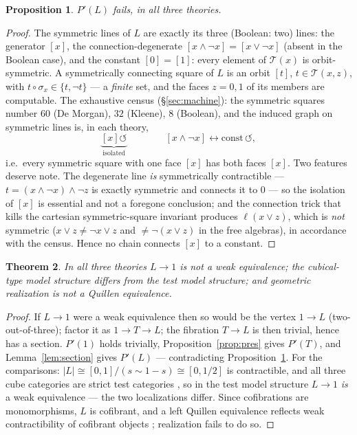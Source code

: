\documentclass[11pt]{amsart}
\newtheorem{thm}{Theorem}[section]
\newtheorem{prop}[thm]{Proposition}
\theoremstyle{definition}
\newcommand{\Ldash}{L}
\begin{document}
\begin{prop}
  \label{prop:census}
  $P'(\Ldash)$ fails, in all three theories.
\end{prop}

\begin{proof}
  The symmetric lines of $\Ldash$ are exactly its three (Boolean:
  two) lines: the generator $[x]$, the connection-degenerate
  $[x \wedge \neg x] = [x \vee \neg x]$ (absent in the Boolean
  case), and the constant $[0] = [1]$: every element of
  $\mathcal{T}(x)$ is orbit-symmetric.  A symmetrically connecting
  square of $\Ldash$ is an orbit $[t]$, $t \in \mathcal{T}(x,z)$,
  with $t \circ \sigma_x \in \{t, \neg t\}$ --- a \emph{finite} set,
  and the faces $z = 0, 1$ of its members are computable.  The
  exhaustive census (\S\ref{sec:machine}): the symmetric squares
  number $60$ (De Morgan), $32$ (Kleene), $8$ (Boolean), and the
  induced graph on symmetric lines is, in each theory,
  \[
    \underbrace{[x] \circlearrowleft}_{\text{isolated}}
    \qquad\qquad
    [x \wedge \neg x] \longleftrightarrow \text{const}
    \,\circlearrowleft ,
  \]
  i.e.\ every symmetric square with one face $[x]$ has both faces
  $[x]$.  Two features deserve note.  The degenerate line
  \emph{is} symmetrically contractible ---
  $t = (x \wedge \neg x) \wedge \neg z$ is exactly symmetric and
  connects it to $0$ --- so the isolation of $[x]$ is essential
  and not a foregone conclusion; and the connection trick that
  kills the cartesian symmetric-square invariant
  \cite[Rem.~1]{CoqNote} produces $\ell(x \vee z)$, which is
  \emph{not} symmetric ($x \vee z \neq \neg x \vee z$ and
  $\neq \neg(x \vee z)$ in the free algebras), in accordance with
  the census.  Hence no chain connects $[x]$ to a constant.
\end{proof}

\begin{thm}
  \label{thm:nogo}
  In all three theories $\Ldash \to 1$ is not a weak equivalence;
  the cubical-type model structure differs from the test model
  structure; and geometric realization is not a Quillen
  equivalence.
\end{thm}

\begin{proof}
  If $\Ldash \to 1$ were a weak equivalence then so would be the
  vertex $1 \to \Ldash$ (two-out-of-three); factor it as
  $1 \to T \to \Ldash$; the fibration $T \to \Ldash$ is then
  trivial, hence has a section.  $P'(1)$ holds trivially,
  Proposition~\ref{prop:pres} gives $P'(T)$, and
  Lemma~\ref{lem:section} gives $P'(\Ldash)$ --- contradicting
  Proposition~\ref{prop:census}.  For the comparisons:
  $|\Ldash| \cong [0,1]/(s \sim 1-s) \cong [0, 1/2]$ is
  contractible, and all three cube categories are strict test
  categories \cite{BuchholtzMorehouse}, so in the test model
  structure $\Ldash \to 1$ \emph{is} a weak equivalence --- the two
  localizations differ.  Since cofibrations are monomorphisms,
  $\Ldash$ is cofibrant, and a left Quillen equivalence reflects
  weak contractibility of cofibrant objects
  \cite[1.3.16]{Hovey}; realization fails to do so.
\end{proof}
\end{document}
